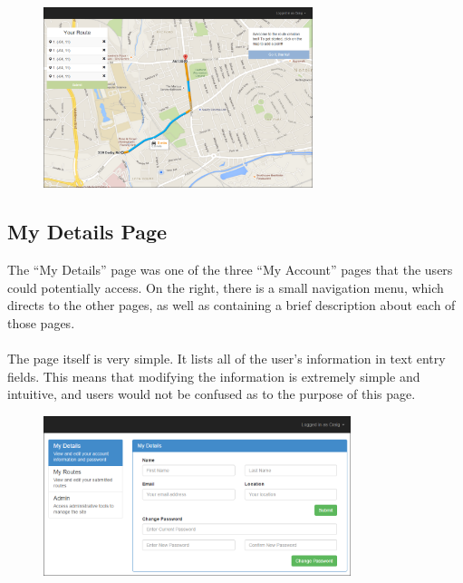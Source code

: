 \documentclass[a4paper,twoside,notitlepage,11pt]{article}
\begin{document}
\begin{figure}[!ht]
	\begin{center}
		\includegraphics[width=0.7\textwidth]{images/final/creation.png}
	\end{center}
	\vspace{-16mm}
\end{figure} 
 
 
 \newpage
 
 
\subsection{My Details Page}
The ``My Details'' page was one of the three ``My Account'' pages that the users could potentially access. On the right, there is a small navigation menu, which directs to the other pages, as well as containing a brief description about each of those pages.\ \\
\ \\
The page itself is very simple. It lists all of the user's information in text entry fields. This means that modifying the information is extremely simple and intuitive, and users would not be confused as to the purpose of this page.

\begin{figure}[!ht]
	\begin{center}
		\includegraphics[width=0.8\textwidth]{images/final/mydetails.png}
	\end{center}
	\vspace{-6mm}
\end{figure}
\end{document}
